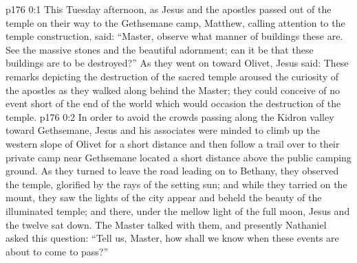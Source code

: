 \author{Midwayer Commission}
\vs p176 0:1 This Tuesday afternoon, as Jesus and the apostles passed out of the temple on their way to the Gethsemane camp, Matthew, calling attention to the temple construction, said: “Master, observe what manner of buildings these are. See the massive stones and the beautiful adornment; can it be that these buildings are to be destroyed?” As they went on toward Olivet, Jesus said:  These remarks depicting the destruction of the sacred temple aroused the curiosity of the apostles as they walked along behind the Master; they could conceive of no event short of the end of the world which would occasion the destruction of the temple.
\vs p176 0:2 In order to avoid the crowds passing along the Kidron valley toward Gethsemane, Jesus and his associates were minded to climb up the western slope of Olivet for a short distance and then follow a trail over to their private camp near Gethsemane located a short distance above the public camping ground. As they turned to leave the road leading on to Bethany, they observed the temple, glorified by the rays of the setting sun; and while they tarried on the mount, they saw the lights of the city appear and beheld the beauty of the illuminated temple; and there, under the mellow light of the full moon, Jesus and the twelve sat down. The Master talked with them, and presently Nathaniel asked this question: “Tell us, Master, how shall we know when these events are about to come to pass?”
